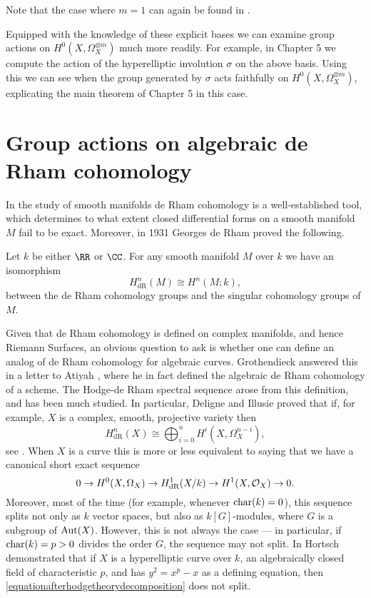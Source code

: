 Note that the case where $m=1$ can again be found in \cite[Prop. 7.4.26]{liu}.

Equipped with the knowledge of these explicit bases we can examine group actions on $H^0(X,\Omega_X^{\otimes m})$ much more readily.
For example, in Chapter 5 we compute the action of the hyperelliptic involution $\sigma$ on the above basis.
Using this we can see when the group generated by $\sigma$ acts faithfully on $H^0(X,\Omega_X^{\otimes m})$, explicating the main theorem of Chapter 5 in this case.

\section{Group actions on algebraic de Rham cohomology}

In the study of smooth manifolds de Rham cohomology is a well-established tool, which determines to what extent closed differential forms on a smooth manifold $M$ fail to be exact.
Moreover, in 1931 Georges de Rham \cite{derhamstheorem} proved the following.
    \begin{unnumthm}
    Let $k$ be either $\RR$ or $\CC$.
    For any smooth manifold $M$ over $k$ we have an isomorphism
        \[
        H^n_{\text{dR}}(M) \cong H^n(M;k),
        \]
    between the de Rham cohomology groups and the singular cohomology groups of $M$.
    \end{unnumthm}

Given that de Rham cohomology is defined on complex manifolds, and hence Riemann Surfaces, an obvious question to ask is whether one can define an analog of de Rham cohomology for algebraic curves.
Grothendieck answered this in a letter to Atiyah \cite{grothendiecklettertoatiyah}, where he in fact defined the algebraic de Rham cohomology of a scheme.
The Hodge-de Rham spectral sequence arose from this definition, and has been much studied.
In particular, Deligne and Illusie proved that if, for example, $X$ is a complex, smooth, projective variety then
    \begin{equation*}
    H^n_{\text{dR}}(X) \cong \bigoplus_{i=0}^n H^i(X,\Omega_X^{n-i}),
    \end{equation*}
see \cite{deligneillusie}.
When $X$ is a curve this is more or less equivalent to saying that we have a canonical short exact sequence
    \begin{equation}\label{equationafterhodgetheorydecomposition}
    0 \rightarrow {H^0(X,\Omega_X)} \rightarrow H_{\text {dR}}^1(X/k) \rightarrow H^1(X,\mathcal{O}_X) \rightarrow 0.
    \end{equation}
Moreover, most of the time (for example, whenever $\operatorname{char}(k) = 0$), this sequence splits not only as $k$ vector spaces, but also as $k[G]$-modules, where $G$ is a subgroup of $\operatorname{Aut}(X)$.
However, this is not always the case --- in particular, if $\operatorname{char}(k) = p >0$ divides the order $G$, the sequence may not split.
In \cite{canonicalrepresentation} Hortsch demonstrated that if $X$ is a hyperelliptic curve over $k$, an algebraically closed field of characteristic $p$, and has $y^2 = x^p-x$ as a defining equation, then \eqref{equationafterhodgetheorydecomposition} does not split.

